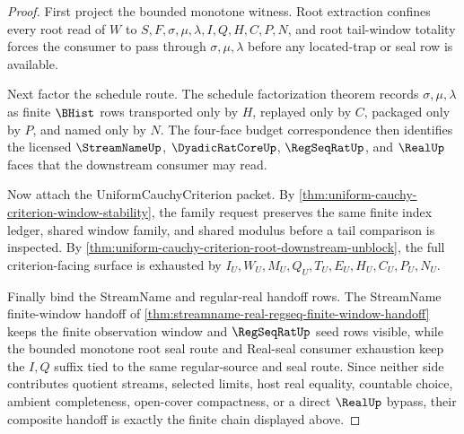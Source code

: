 \begin{proof}
First project the bounded monotone witness. Root extraction confines every root read of $W$ to $S,F,\sigma,\mu,\lambda,I,Q,H,C,P,N$, and root tail-window totality forces the consumer to pass through $\sigma,\mu,\lambda$ before any located-trap or seal row is available.

Next factor the schedule route. The schedule factorization theorem records $\sigma,\mu,\lambda$ as finite $\BHist$ rows transported only by $H$, replayed only by $C$, packaged only by $P$, and named only by $N$. The four-face budget correspondence then identifies the licensed $\StreamNameUp$, $\DyadicRatCoreUp$, $\RegSeqRatUp$, and $\RealUp$ faces that the downstream consumer may read.

Now attach the UniformCauchyCriterion packet. By \autoref{thm:uniform-cauchy-criterion-window-stability}, the family request preserves the same finite index ledger, shared window family, and shared modulus before a tail comparison is inspected. By \autoref{thm:uniform-cauchy-criterion-root-downstream-unblock}, the full criterion-facing surface is exhausted by $I_U,W_U,M_U,Q_U,T_U,E_U,H_U,C_U,P_U,N_U$.

Finally bind the StreamName and regular-real handoff rows. The StreamName finite-window handoff of \autoref{thm:streamname-real-regseq-finite-window-handoff} keeps the finite observation window and $\RegSeqRatUp$ seed rows visible, while the bounded monotone root seal route and Real-seal consumer exhaustion keep the $I,Q$ suffix tied to the same regular-source and seal route. Since neither side contributes quotient streams, selected limits, host real equality, countable choice, ambient completeness, open-cover compactness, or a direct $\RealUp$ bypass, their composite handoff is exactly the finite chain displayed above.
\end{proof}

